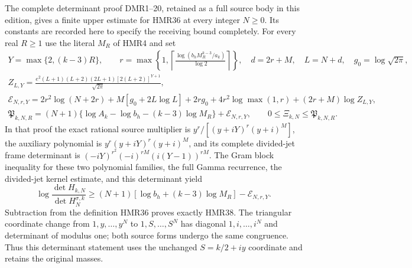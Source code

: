 The complete determinant proof DMR1--20, retained as a full
source body in this edition, gives a finite upper estimate
for HMR36 at every integer $N\geq0$. Its constants are recorded
here to specify the receiving bound completely. For every
real $R\geq1$ use the literal $M_R$ of HMR4 and set
\[
\begin{gathered}
 Y=\max\{2,(k-3)R\},\qquad
 r=\max\left\{1,\left\lceil
 \frac{\log(b_hM_R^{k-3}/a_k)}{\log2}\right\rceil\right\},
 \quad d=2r+M,\quad L=N+d,\quad g_0=\log\sqrt{2\pi},\\
 Z_{L,Y}=\frac{e^2(L+1)(L+2)(2L+1)
                   [2(L+2)]^{Y+1}}{\sqrt{2\pi}},\\
 \mathcal E_{N,r,Y}
 =2r^2\log(N+2r)+M[g_0+2L\log L]+2rg_0
   +4r^2\log\max(1,r)+(2r+M)\log Z_{L,Y},\\
 \mathfrak P_{k,N,R}
 =(N+1)\{\log A_k-\log b_h-(k-3)\log M_R\}
       +\mathcal E_{N,r,Y},\qquad
 0\leq\Xi_{k,N}\leq\mathfrak P_{k,N,R}.
\end{gathered}\tag{HMR38}
\]
In that proof the exact rational source multiplier is
$y^r/[(y+iY)^r(y+i)^M]$, the auxiliary polynomial is
$y^r(y+iY)^r(y+i)^M$, and its complete divided-jet frame
determinant is
$(-iY)^{r^2}(-i)^{rM}(i(Y-1))^{rM}$.
The Gram block inequality for these two polynomial families,
the full Gamma recurrence, the divided-jet kernel estimate,
and this determinant yield
\[
 \log\frac{\det H_{k,N}}{\det H_N^{\sigma,k}}
 \geq(N+1)[\log b_h+(k-3)\log M_R]-\mathcal E_{N,r,Y}.
\]
Subtraction from the definition HMR36 proves exactly HMR38.
The triangular coordinate change from $1,y,\ldots,y^N$ to
$1,S,\ldots,S^N$ has diagonal $1,i,\ldots,i^N$ and determinant
of modulus one; both source forms undergo the same congruence.
Thus this determinant statement uses the unchanged $S=k/2+iy$
coordinate and retains the original masses.

